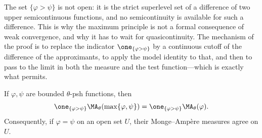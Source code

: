 The set $\{\varphi>\psi\}$ is not open: it is the strict superlevel set of
a difference of two upper semicontinuous functions, and no semicontinuity is
available for such a difference.  This is why the maximum principle is not a
formal consequence of weak convergence, and why it has to wait for
quasicontinuity.  The mechanism of the proof is to replace the indicator
$\one_{\{\varphi>\psi\}}$ by a continuous cutoff of the difference of the
approximants, to apply the model identity to that, and then to pass to the
limit in both the measure and the test function---which is exactly what
 permits.

\begin{theorem}
\label{thm:bounded-maximum-principle}
If $\varphi,\psi$ are bounded $\theta$-psh functions, then
\begin{equation}
\label{eq:bounded-maximum-principle}
 \one_{\{\varphi>\psi\}}\MA_\theta(\max\{\varphi,\psi\})
 =\one_{\{\varphi>\psi\}}\MA_\theta(\varphi).
\end{equation}
Consequently, if $\varphi=\psi$ on an open set $U$, their
Monge--Amp\`ere measures agree on $U$.
\end{theorem}

